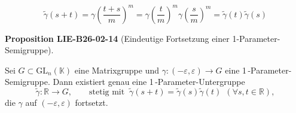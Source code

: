 \documentclass[10pt, letterpaper]{article}
\newcommand{\GL}{\mathrm{GL}}
\newcommand{\CustomHeading}[3]{%
  \par\medskip\noindent%
  \textbf{#1 #2} \textnormal{(#3)}.\enskip%
}
\newenvironment{PROP}[2]{\begin{unitbox}\CustomHeading{Proposition}{#1}{#2}}{\end{unitbox}}
\begin{document}
$$
\tilde{\gamma}(s+t)=\gamma\left(\frac{t+s}{m}\right)^{m}=\gamma\left(\frac{t}{m}\right)^{m} \gamma\left(\frac{s}{m}\right)^{m}=\tilde{\gamma}(t) \tilde{\gamma}(s)
$$



\begin{PROP}{LIE-B26-02-14}{Eindeutige Fortsetzung einer 1-Parameter-Semigruppe}
Sei $G\subset \GL_n(\mathbb{K})$ eine Matrixgruppe und 
$\gamma:(-\varepsilon,\varepsilon)\to G$ eine 1\,-Parameter-Semigruppe.
Dann existiert genau eine 1\,-Parameter-Untergruppe
\[
\tilde{\gamma}:\mathbb{R}\longrightarrow G,\qquad
\text{stetig mit }\ \tilde{\gamma}(s+t)=\tilde{\gamma}(s)\tilde{\gamma}(t)\ \ (\forall s,t\in\mathbb{R}),
\]
die $\gamma$ auf $(-\varepsilon,\varepsilon)$ fortsetzt.
\end{PROP}
\end{document}
